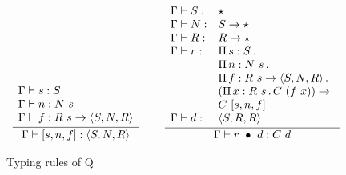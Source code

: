 \documentclass{article}
\begin{document}
\begin{figure}
\[\begin{array}{lllll}
          \\ \\ 
\infer{\Gamma \vdash \ctor{s}{n}{f} : \w{S}{N}{R}}
      {\begin{array}{l}\Gamma \vdash s : S \\ \Gamma \vdash n : N\ s \\ \Gamma \vdash f : R\ s \to \w{S}{N}{R}\end{array}}
      &\ &
\infer{\Gamma \vdash \wrec{r}{d} : C\ d}
      {
        \begin{array}{lll}
\Gamma \vdash S : & \star \\
\Gamma \vdash N : & S \to \star \\
\Gamma \vdash R : & R \to \star \\          
\Gamma \vdash r : & \Pia{s}{S}{\ }  \\
\ &  \Pia{n}{N\ s}{\ }  \\
\ &  \Pia{f}{R\ s \to \w{S}{N}{R}}{\ }  \\
\ &  (\Pia{x}{R\ s}{C\ (f\ x)}) \to  \\
\ &  C\ \ctor{s}{n}{f} \\
\Gamma\vdash d : & \w{S}{R}{R}
        \end{array} }
  \end{array}
  \]
  \caption{Typing rules of Q}
  \label{fig:tp}
\end{figure}




\end{document}
